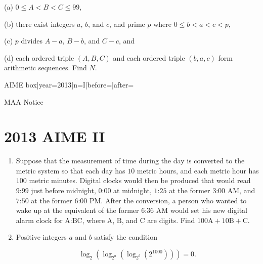 \documentclass{article}
\begin{document}
\begin{enumerate}[label=\arabic*., itemsep=0.5em]
(a) $0\le A<B<C\le99$, 

(b) there exist integers $a$, $b$, and $c$, and prime $p$ where $0\le b<a<c<p$, 

(c) $p$ divides $A-a$, $B-b$, and $C-c$, and 

(d) each ordered triple $(A,B,C)$ and each ordered triple $(b,a,c)$ form arithmetic sequences. Find $N$.



{{AIME box|year=2013|n=I|before=|after=}}

{{MAA Notice}}\par \vspace{0.5em}\end{enumerate}\newpage\section*{2013 AIME II}\begin{enumerate}[label=\arabic*., itemsep=0.5em]\item Suppose that the measurement of time during the day is converted to the metric system so that each day has $10$ metric hours, and each metric hour has $100$ metric minutes. Digital clocks would then be produced that would read $\text{9:99}$ just before midnight, $\text{0:00}$ at midnight, $\text{1:25}$ at the former $\text{3:00}$ AM, and $\text{7:50}$ at the former $\text{6:00}$ PM. After the conversion, a person who wanted to wake up at the equivalent of the former $\text{6:36}$ AM would set his new digital alarm clock for $\text{A:BC}$, where $\text{A}$, $\text{B}$, and $\text{C}$ are digits. Find $100\text{A}+10\text{B}+\text{C}$.\par \vspace{0.5em}\item Positive integers $a$ and $b$ satisfy the condition

\begin{equation*}
\log_2(\log_{2^a}(\log_{2^b}(2^{1000}))) = 0.
\end{equation*}


\end{enumerate}
\end{document}
